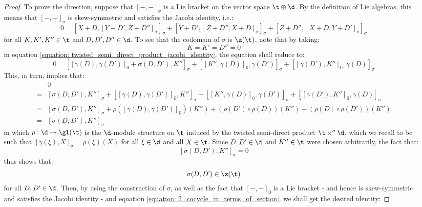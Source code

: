 \begin{proof}
                To prove the  direction, suppose that $[-, -]_{\sigma}$ is a Lie bracket on the vector space $\t \oplus \d$. By the definition of Lie algebras, this means that $[-, -]_{\sigma}$ is skew-symmetric and satisfies the Jacobi identity, i.e.:
                    \begin{equation} \label{equation: twisted_semi_direct_product_jacobi_identity}
                        0 = [ X + D, [Y + D', Z + D'']_{\sigma} ]_{\sigma} + [ Y + D', [Z + D'', X + D]_{\sigma} ]_{\sigma} + [ Z + D'', [X + D, Y + D']_{\sigma} ]_{\sigma}
                    \end{equation}
                for all $K, K', K'' \in \t$ and $D, D', D'' \in \d$. To see that the codomain of $\sigma$ is $\z(\t)$, note that by taking:
                    $$K = K' = D'' = 0$$
                in equation \eqref{equation: twisted_semi_direct_product_jacobi_identity}, the equation shall reduce to:
                    $$0 = [[\gamma(D), \gamma(D')]_0 + \sigma(D, D'), K'']_{\sigma} + [[K'', \gamma(D)]_0, \gamma(D')]_{\sigma} + [[\gamma(D'), K'']_0, \gamma(D)]_{\sigma}$$
                This, in turn, implies that:
                    $$
                        \begin{aligned}
                            & 0
                            \\
                            = & [\sigma(D, D'), K'']_{\sigma} + [[\gamma(D), \gamma(D')]_0, K'']_{\sigma} + [[K'', \gamma(D)]_0, \gamma(D')]_{\sigma} + [[\gamma(D'), K'']_0, \gamma(D)]_{\sigma}
                            \\
                            = & [\sigma(D, D'), K'']_{\sigma} + \rho( [\gamma(D), \gamma(D')]_0 )(K'') + ( \rho(D') \circ \rho(D) )(K'') - ( \rho(D) \circ \rho(D') )(K'')
                            \\
                            = & [\sigma(D, D'), K'']_{\sigma}
                        \end{aligned}
                    $$
                in which $\rho: \d \to \gl(\t)$ is the $\d$-module structure on $\t$ induced by the twisted semi-direct product $\t \rtimes^{\sigma} \d$, which we recall to be such that $[\gamma(\xi), X]_{\sigma} = \rho(\xi)(X)$ for all $\xi \in \d$ and all $X \in \t$. Since $D, D' \in \d$ and $K'' \in \t$ were chosen arbitrarily, the fact that:
                    $$[\sigma(D, D'), K'']_{\sigma} = 0$$
                thus shows that:
                    $$\sigma(D, D') \in \z(\t)$$
                for all $D, D' \in \d$. Then, by using the construction of $\sigma$, as well as the fact that $[-, -]_0$ is a Lie bracket - and hence is skew-symmetric and satisfies the Jacobi identity - and equation \eqref{equation: 2_cocycle_in_terms_of_section}, we shall get the desired identity:

\end{proof}
